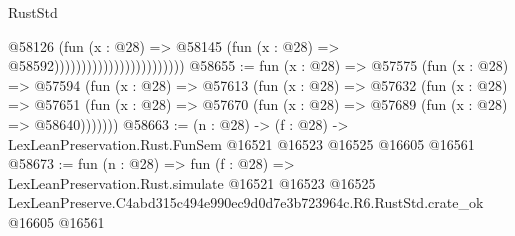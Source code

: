 \begin{lexlean}{RustStd}
\begin{coremodule}
                                              @58126
                                                (fun (x : @28) =>
                                                @58145
                                                  (fun (x : @28) => @58592))))))))))))))))))))))))
@58655 := fun (x : @28) =>
  @57575
    (fun (x : @28) =>
    @57594
      (fun (x : @28) =>
      @57613
        (fun (x : @28) =>
        @57632
          (fun (x : @28) =>
          @57651 (fun (x : @28) => @57670 (fun (x : @28) => @57689 (fun (x : @28) => @58640)))))))
@58663 := (n : @28) ->
  (f : @28) -> LexLeanPreservation.Rust.FunSem @16521 @16523 @16525 @16605 @16561
@58673 := fun (n : @28) =>
  fun (f : @28) =>
  LexLeanPreservation.Rust.simulate
    @16521
    @16523
    @16525
    LexLeanPreserve.C4abd315c494e990ec9d0d7e3b723964c.R6.RustStd.crate_ok
    @16605
    @16561
\end{coremodule}
\end{lexlean}
